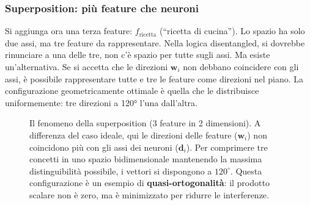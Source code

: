 \subsubsection{Superposition: più feature che neuroni}
Si aggiunga ora una terza feature: $f_{\text{ricetta}}$ (``ricetta di cucina''). Lo spazio ha solo due assi, ma tre feature da rappresentare. Nella logica disentangled, si dovrebbe rinunciare a una delle tre, non c'è spazio per tutte sugli assi.
Ma esiste un'alternativa. Se si accetta che le direzioni $\mathbf{w}_i$ non debbano coincidere con gli assi, è possibile rappresentare tutte e tre le feature come direzioni nel piano. La configurazione geometricamente ottimale è quella che le distribuisce uniformemente: tre direzioni a 120° l'una dall'altra.
\begin{figure}[htbp]
    \centering
    \caption{Il fenomeno della superposition (3 feature in 2 dimensioni). A differenza del caso ideale, qui le direzioni delle feature ($\mathbf{w}_i$) non coincidono più con gli assi dei neuroni ($\mathbf{d}_i$). Per comprimere tre concetti in uno spazio bidimensionale mantenendo la massima distinguibilità possibile, i vettori si dispongono a $120^\circ$. Questa configurazione è un esempio di \textbf{quasi-ortogonalità}: il prodotto scalare non è zero, ma è minimizzato per ridurre le interferenze.}
    \label{fig:superposition_three_features}
\end{figure}
